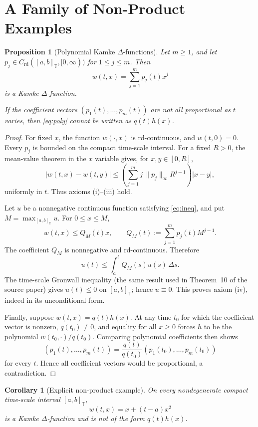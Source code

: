 \documentclass[11pt]{article}
\newtheorem{proposition}{Proposition}
\newtheorem{corollary}{Corollary}
\newcommand{\T}{\mathbb T}
\newcommand{\Rd}{C_{\mathrm{rd}}}
\newcommand{\Deltas}{\,\Delta s}
\begin{document}
\section*{A Family of Non-Product Examples}

\begin{proposition}[Polynomial Kamke $\Delta$-functions]\label{prop:poly}
Let $m\geq1$, and let
$p_j\in\Rd([a,b]_{\T},[0,\infty))$ for $1\leq j\leq m$.  Then
\begin{equation}\label{eq:poly}
                  w(t,x)=\sum_{j=1}^m p_j(t)x^j
\end{equation}
is a Kamke $\Delta$-function.

If the coefficient vectors
$(p_1(t),\ldots,p_m(t))$ are not all proportional as $t$ varies, then
\eqref{eq:poly} cannot be written as $q(t)h(x)$.
\end{proposition}

\begin{proof}
For fixed $x$, the function $w(\cdot,x)$ is rd-continuous, and
$w(t,0)=0$.  Every $p_j$ is bounded on the compact time-scale interval.
For a fixed $R>0$, the mean-value theorem in the $x$ variable gives, for
$x,y\in[0,R]$,
\[
 |w(t,x)-w(t,y)|
 \leq
 \left(\sum_{j=1}^m j\,\|p_j\|_\infty R^{j-1}\right)|x-y|,
\]
uniformly in $t$.  Thus axioms (i)--(iii) hold.

Let $u$ be a nonnegative continuous function satisfying \eqref{eq:ineq}, and
put $M=\max_{[a,b]_{\T}}u$.  For $0\leq x\leq M$,
\[
 w(t,x)\leq Q_M(t)x,
 \qquad
 Q_M(t):=\sum_{j=1}^m p_j(t)M^{j-1}.
\]
The coefficient $Q_M$ is nonnegative and rd-continuous.  Therefore
\[
 u(t)\leq\int_a^t Q_M(s)u(s)\Deltas.
\]
The time-scale Gronwall inequality (the same result used in Theorem~10 of the
source paper) gives $u(t)\leq0$ on $[a,b]_{\T}$; hence $u\equiv0$.
This proves axiom (iv), indeed in its unconditional form.

Finally, suppose $w(t,x)=q(t)h(x)$.  At any time $t_0$ for which the
coefficient vector is nonzero, $q(t_0)\neq0$, and equality for all $x\geq0$
forces $h$ to be the polynomial $w(t_0,\cdot)/q(t_0)$.  Comparing polynomial
coefficients then shows
\[
 (p_1(t),\ldots,p_m(t))
 =\frac{q(t)}{q(t_0)}(p_1(t_0),\ldots,p_m(t_0))
\]
for every $t$.  Hence all coefficient vectors would be proportional, a
contradiction.
\end{proof}

\begin{corollary}[Explicit non-product example]\label{cor:example}
On every nondegenerate compact time-scale interval $[a,b]_{\T}$,
\[
                         \boxed{\;w(t,x)=x+(t-a)x^2\;}
\]
is a Kamke $\Delta$-function and is not of the form $q(t)h(x)$.
\end{corollary}
\end{document}
